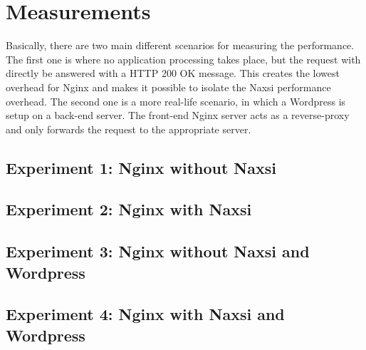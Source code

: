 \documentclass[Measurements]{subfiles}
\begin{document}
\section{Measurements}
\label{sec:Measurements}
Basically, there are two main different scenarios for measuring the performance. The first one is where no application processing takes place, but the request with directly be answered with a HTTP 200 OK message. This creates the lowest overhead for Nginx and makes it possible to isolate the Naxsi performance overhead. The second one is a more real-life scenario, in which a Wordpress is setup on a back-end server. The front-end Nginx server acts as a reverse-proxy and only forwards the request to the appropriate server.

\subsection{Experiment 1: Nginx without Naxsi}

\subsection{Experiment 2: Nginx with Naxsi}

\subsection{Experiment 3: Nginx without Naxsi and Wordpress}

\subsection{Experiment 4: Nginx with Naxsi and Wordpress}
\end{document}
